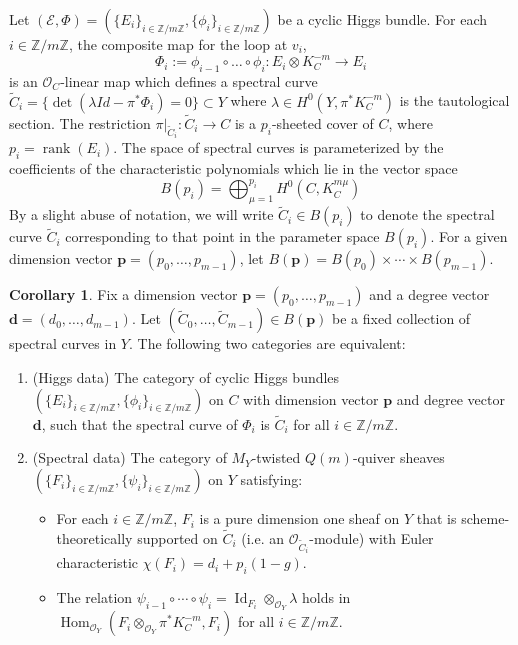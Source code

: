 \documentclass[11pt]{amsart}
\theoremstyle{plain}
\theoremstyle{definition}
\newtheorem{cor}[theorem]{Corollary}
\theoremstyle{remark}
\def\O{\mathcal{O}}
\def\zm{\mathbb{Z}/m\mathbb{Z}}
\def\tC{\widetilde{C}}
\begin{document}
Let $(\mathcal{E}, \Phi) =(\{E_i\}_{i\in \zm}, \{\phi_i\}_{i\in \zm})$ be a cyclic Higgs bundle. For each $i \in \mathbb{Z}/m\mathbb{Z}$, the composite map for the loop at $v_i$, 
$$ \Phi_i := \phi_{i-1} \circ \dots \circ \phi_i : E_i \otimes K_C^{-m} \to E_i $$
is an $\mathcal{O}_C$-linear map which defines a spectral curve $\tC_i =\{\det(\lambda Id - \pi^*\Phi_i)=0\}  \subset Y$ where $\lambda\in H^0(Y, \pi^*K_C^{-m})$ is the tautological section. The restriction $\pi|_{\tC_i}:\tC_i\to C$ is a $p_i$-sheeted cover of $C$, where $p_i = \operatorname{rank}(E_i)$. The space of spectral curves is parameterized by the coefficients of the characteristic polynomials which lie in the vector space
\[ B(p_i)= \bigoplus_{\mu=1}^{p_i} H^0(C, K_C^{m\mu} )\] 
By a slight abuse of notation, we will write $\tC_i \in B(p_i)$ to denote the spectral curve $\tC_i$ corresponding to that point in the parameter space $B(p_i)$. For a given dimension vector $\bm{p}=(p_0,\dots, p_{m-1})$, let $B(\bm{p})= B(p_0)\times \cdots \times B(p_{m-1})$. 
\begin{cor}\label{cor:equiv5}
    Fix a dimension vector $\bm{p}=(p_0, \dots, p_{m-1})$ and a degree vector $\bm{d}=(d_0, \dots, d_{m-1})$.
Let $(\tC_0, \dots,\tC_{m-1})\in B(\bm{p})$ be a fixed collection of spectral curves in $Y$. The following two categories are equivalent:
\begin{enumerate}
    \item (Higgs data) The category of cyclic Higgs bundles $(\{E_i\}_{i\in \zm}, \{\phi_i\}_{i\in \zm})$ on $C$ with dimension vector $\bm{p}$ and degree vector $\bm{d}$, such that the spectral curve of  $\Phi_i$ is $\tC_i$ for all $i\in \zm$.
    
    \item (Spectral data) The category of $M_Y$-twisted $Q(m)$-quiver sheaves $(\{F_i\}_{i\in\zm}, \{\psi_i\}_{i\in\zm})$ on $Y$ satisfying:
    \begin{itemize}
        \item[(a)] For each $i \in \mathbb{Z}/m\mathbb{Z}$, $F_i$ is a pure dimension one sheaf on $Y$ that is scheme-theoretically supported on $\tC_i$ (i.e. an $\O_{\tC_i}$-module) with Euler characteristic $\chi(F_i)= d_i + p_i(1-g)$. 
        \item[(b)] The relation $\psi_{i-1}\circ\cdots \circ \psi_{i} = \operatorname{Id}_{F_i}\otimes_{\O_Y} \lambda $ holds in $\operatorname{Hom}_{\O_Y}(F_i\otimes_{\O_Y} \pi^*K_C^{-m}, F_i )$ for all $i\in \mathbb{Z}/m\mathbb{Z}$. 
    \end{itemize}
\end{enumerate}
\end{cor}
\end{document}
